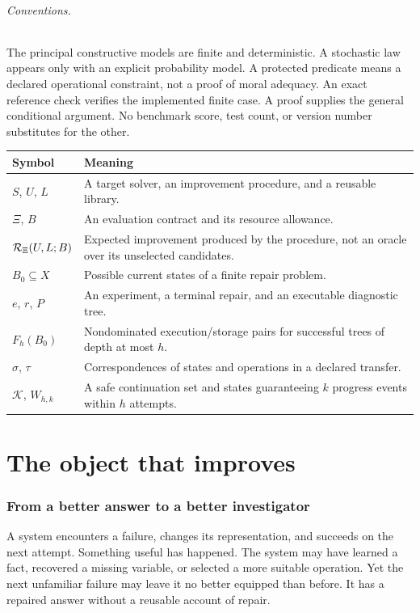 \documentclass[11pt,letterpaper]{article}
\theoremstyle{plain}
\theoremstyle{definition}
\begin{document}
\paragraph{Conventions.}
The principal constructive models are finite and deterministic. A stochastic law appears only with an explicit probability model. A protected predicate means a declared operational constraint, not a proof of moral adequacy. An exact reference check verifies the implemented finite case. A proof supplies the general conditional argument. No benchmark score, test count, or version number substitutes for the other.

\begin{center}\small
\begin{tabularx}{\textwidth}{@{}lX@{}}\toprule
Symbol & Meaning\\\midrule
$S$, $U$, $L$ & A target solver, an improvement procedure, and a reusable library.\\
$\Xi$, $B$ & An evaluation contract and its resource allowance.\\
$\mathcal R_\Xi(U,L;B)$ & Expected improvement produced by the procedure, not an oracle over its unselected candidates.\\
$B_0\subseteq X$ & Possible current states of a finite repair problem.\\
$e$, $r$, $P$ & An experiment, a terminal repair, and an executable diagnostic tree.\\
$F_h(B_0)$ & Nondominated execution/storage pairs for successful trees of depth at most $h$.\\
$\sigma$, $\tau$ & Correspondences of states and operations in a declared transfer.\\
$\mathcal K$, $W_{h,k}$ & A safe continuation set and states guaranteeing $k$ progress events within $h$ attempts.\\\bottomrule
\end{tabularx}\end{center}
\clearpage{}
\part{The object that improves}
\section{From a better answer to a better investigator}\label{sec:introduction}
A system encounters a failure, changes its representation, and succeeds on the next attempt. Something useful has happened. The system may have learned a fact, recovered a missing variable, or selected a more suitable operation. Yet the next unfamiliar failure may leave it no better equipped than before. It has a repaired answer without a reusable account of repair.
\end{document}
